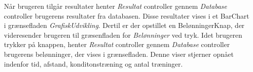 \noindent 
Når brugeren tilgår resultater henter \textit{Resultat} controller gennem \textit{Database} controller brugerens resultater fra databasen. Disse resultater vises i et BarChart i grænsefladen \textit{GrafiskUdvikling}. Dertil er der opstillet en BelønningerKnap, der videresender brugeren til græsenfladen for \textit{Belønninger} ved tryk. Idet brugeren trykker på knappen, henter \textit{Resultat} controller gennem \textit{Database} controller brugerens belønninger, der vises i grænsefladen. Denne viser stjerner opnået indenfor tid, afstand, konditonstræning og antal træninger.

